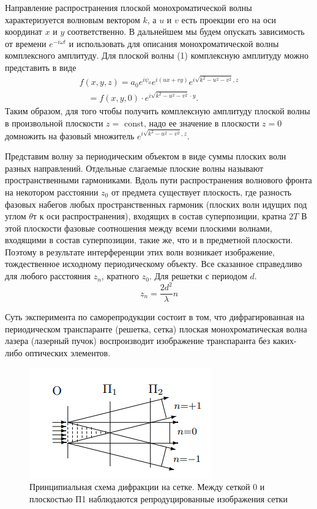 \documentclass[a4paper, 12pt]{article}%
\begin{document}
	Направление распространения плоской монохроматической волны характеризуется волновым вектором $k$, а $u$ и $v$ есть проекции его на оси координат $x$ и $y$ соответственно. В дальнейшем мы будем опускать зависимость от времени $e^{-i \omega t}$ и использовать для описания монохроматической волны комплексного амплитуду. Для плоской волны (1) комплексную амплитуду можно представить в виде
	$$
	\begin{array}{l} 
		f(x, y, z)=a_0 e^{i \psi_0} e^{i(u x+v y)} e^{i \sqrt{k^2-u^2-v^2}, z} \\
		\quad=f(x, y, 0) \cdot e^{i \sqrt{k^2-u^2-v^2} \cdot y} .
	\end{array}
	$$
	Таким образом, для того чтобы получить комплексную амплитуду плоской волны в произвольной плоскости $z=$ const, надо ее значение в плоскости $z=0$ домножить на фазовый множитель $e^{i \sqrt{k^2-u^2-v^2}, z}$.
	
	Представим волну за периодическим объектом в виде суммы плоских волн разных направлений. Отдельные слагаемые плоские волны называют пространственными гармониками. Вдоль пути распространения волнового фронта на некотором расстоянии $z_0$ от предмета существует плоскость, где разность фазовых набегов любых пространственных гармоник (плоских волн идущих под углом $\theta$т к оси распространения), входящих в состав суперпозиции, кратна $2T$ В этой плоскости фазовые соотношения между всеми плоскими волнами, входящими в состав суперпозиции, такие же, что и в предметной плоскости. Поэтому в результате интерференции этих волн возникает изображение, тождественное исходному периодическому объекту. Все сказанное справедливо для любого расстояния $z_n$, кратного $z_0$. Для решетки с периодом $d$.
	\begin{equation}
		z_n = \frac{2d^2}{\lambda}n
	\end{equation}
	
	Суть эксперимента по саморепродукции состоит в том, что дифрагированная на периодическом транспаранте (решетка, сетка) плоская монохроматическая волна лазера (лазерный пучок) воспроизводит изображение транспаранта без каких-либо оптических элементов.
	
	\begin{figure}[H]
		\centering
		\includegraphics[scale=2]{fig1.png}
		\caption{Принципиальная схема
			дифракции на сетке. Между сеткой 0 и плоскостью
			П1 наблюдаются репродуцированные изображения сетки}
	\end{figure}
\end{document}
